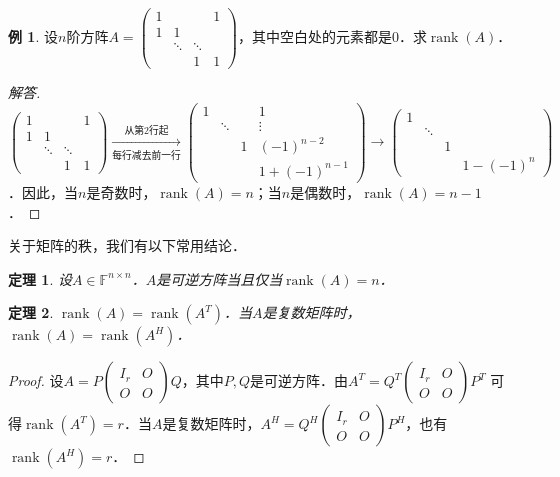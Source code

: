 \documentclass[a4paper,fontset=windows]{ctexbook}
\newtheorem{theorem}{定理}[chapter]
\theoremstyle{definition}
\newtheorem{example}{例}[chapter]
\DeclareMathOperator{\rank}{rank}
\begin{document}
\begin{example}
设$n$阶方阵$A=\begin{pmatrix}1&&&1 \\ 1&1&& \\ &\ddots&\ddots& \\ &&1&1\end{pmatrix}$，其中空白处的元素都是0．求$\rank(A)$．
\end{example}

\begin{proof}[解答]
$\begin{pmatrix}1&&&1 \\ 1&1&& \\ &\ddots&\ddots& \\ &&1&1\end{pmatrix}\xrightarrow[\text{每行减去前一行}]{\text{从第2行起}}\begin{pmatrix}1&&&1 \\ &\ddots&&\vdots \\ &&1&(-1)^{n-2} \\ &&&1+(-1)^{n-1}\end{pmatrix}\to\begin{pmatrix}1&&& \\ &\ddots&& \\ &&1& \\ &&&1-(-1)^n\end{pmatrix}$．\linebreak 因此，当$n$是奇数时，$\rank(A)=n$；当$n$是偶数时，$\rank(A)=n-1$．
\end{proof}

关于矩阵的秩，我们有以下常用结论．

\begin{theorem}
设$A\in\mathbb{F}^{n\times n}$．$A$是可逆方阵当且仅当$\rank(A)=n$．
\end{theorem}

\begin{theorem}
$\rank(A)=\rank(A^T)$．当$A$是复数矩阵时，$\rank(A)=\rank(A^H)$．
\end{theorem}

\begin{proof}
设$A=P\begin{pmatrix}I_r&O \\ O&O\end{pmatrix}Q$，其中$P,Q$是可逆方阵．由$A^T=Q^T\begin{pmatrix}I_r&O \\ O&O\end{pmatrix}P^T$ 可得$\rank(A^T)=r$．当$A$是复数矩阵时，$A^H=Q^H\begin{pmatrix}I_r&O \\ O&O\end{pmatrix}P^H$，也有$\rank(A^H)=r$．
\end{proof}
\end{document}
